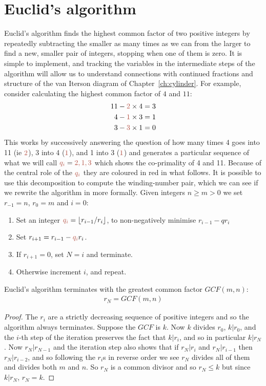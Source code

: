 \section{Euclid's algorithm}
\label{sec:euclid}
Euclid's algorithm finds the highest common factor of two positive integers by repeatedly subtracting the smaller as many times as we can from the larger to find a new, smaller pair of integers,  stopping when one of them is zero. It is  simple to implement, and tracking the variables in the intermediate steps of the algorithm will allow us to understand connections with continued fractions and structure of the van Iterson diagram of Chapter~\ref{ch:cylinder}.
For example, consider calculating the highest common factor of $4$ and $11$:
\begin{align}
	11 - {\jHeadingColour 2}\times 4 & = 3 
	\\
	4 - {\jHeadingColour 1}\times 3 & = 1\label{eq:411}
	\\
	3 - {\jHeadingColour 3}\times 1 & = 0 
\end{align}
%
This works by successively answering the question of how many times 4 goes into 11 (ie ${\jHeadingColour 2}$), 3 into 4  (${\jHeadingColour 1}$), and 1 into 3 (${\jHeadingColour 1}$) and generates 
a particular sequence of what we will call  $\jqi={\jHeadingColour 2, 1, 3}$ which shows the co-primality of 4 and 11. Because of the central role of the $\jqi$ they are coloured in red in what follows. It is possible to use this decomposition to compute the winding-number pair, which we can see if we rewrite the algorithm in more formally. 
Given integers $n\geq m>0$  we set $r_{-1}=n$, $r_0=m$ and $i=0$:
\begin{enumerate}
	\item Set an integer $\jqi=\lfloor r_{i-1}/r_i \rfloor $, to non-negatively minimise $r_{i-1}-q r_{i}$ 
	\item  Set  $r_{i+1}=r_{i-1}-\jqi r_{i}$. 
	\item If $r_{i+1}=0$, set $N=i$ and terminate.
	\item Otherwise increment $i$, and repeat.
\end{enumerate}
\begin{theorem}
	Euclid's algorithm terminates with the greatest common factor $GCF(m,n)$:
	\begin{eqnarray}
		r_N =  
		GCF(m,n) 
	\end{eqnarray}
\end{theorem}
\begin{proof}
	The $r_i$ are a strictly decreasing sequence of positive integers and so the algorithm always terminates. Suppose the $GCF$ is $k$. Now $k$ divides $r_0$, $k|r_0$, and the $i$-th step of the iteration preserves the fact that  $k|r_i$,  and so in particular $k|r_N$. Now $r_N|r_{N-1}$ and the iteration step also shows that if $r_N|r_i$ and $r_N|r_{i-1}$ then $r_N|r_{i-2}$, and so following the $r_i$s in reverse order we see $r_N$ divides all of them and divides both $m$ and $n$.  So $r_N$ is a common divisor and so $r_N\leq k$ but since $k|r_N$, $r_N=k$. 
\end{proof}

